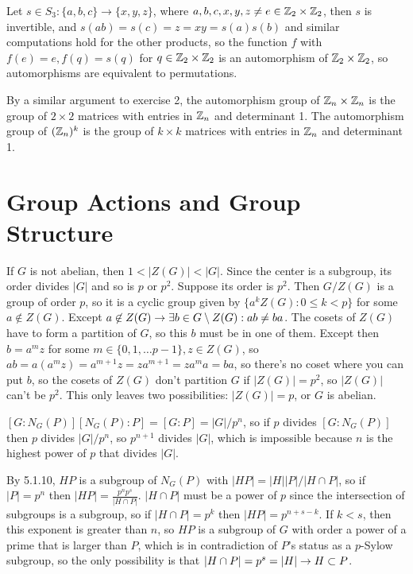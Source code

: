 \documentclass[11pt, oneside]{article}   	%
\begin{document}
\item Let $s \in S_3: \{a, b, c\} \to \{x, y, z\}$, where $a, b, c, x, y, z \not= e \in \mathbb{Z}_2 \times \mathbb{Z}_2$, then $s$ is invertible, and $s(ab) = s(c) = z = xy = s(a)s(b)$ and similar computations hold for the other products, so the function $f$ with $f(e) = e, f(q) = s(q)$ for $q \in \mathbb{Z}_2 \times \mathbb{Z}_2$ is an automorphism of $\mathbb{Z}_2 \times \mathbb{Z}_2$, so automorphisms are equivalent to permutations.
\ee
\item By a similar argument to exercise 2, the automorphism group of $\mathbb{Z}_n \times \mathbb{Z}_n$ is the group of $2 \times 2$ matrices with entries in $\mathbb{Z}_n$ and determinant 1. The automorphism group of $(\mathbb{Z}_n)^k$ is the group of $k \times k$ matrices with entries in $\mathbb{Z}_n$ and determinant 1.
\ee
\section{Group Actions and Group Structure}
\be
\item If $G$ is not abelian, then $1 < |Z(G)| < |G|$. Since the center is a subgroup, its order divides $|G|$ and so is $p$ or $p^2$. Suppose its order is $p^2$. Then $G/Z(G)$ is a group of order $p$, so it is a cyclic group given by $\{a^kZ(G): 0 \le k < p\}$ for some $a \not \in Z(G)$. Except $a \not \in Z(G) \rightarrow \exists b \in G \setminus Z(G): ab \not = ba$. The cosets of $Z(G)$ have to form a partition of $G$, so this $b$ must be in one of them. Except then $b = a^mz$ for some $m \in \{0, 1, \ldots p-1\}, z \in Z(G)$, so $ab = a(a^mz) = a^{m+1}z = za^{m+1} = za^ma = ba$, so there's no coset where you can put $b$, so the cosets of $Z(G)$ don't partition $G$ if $|Z(G)| = p^2$, so $|Z(G)|$ can't be $p^2$. This only leaves two possibilities: $|Z(G)| = p$, or $G$ is abelian.
\item $[G:N_G(P)][N_G(P):P] = [G:P] = |G| / p^n$, so if $p$ divides $[G:N_G(P)]$ then $p$ divides $|G|/p^n$, so $p^{n+1}$ divides $|G|$, which is impossible because $n$ is the highest power of $p$ that divides $|G|$.
\item By 5.1.10, $HP$ is a subgroup of $N_G(P)$ with $|HP| = |H||P| / |H \cap P|$, so if $|P| = p^n$ then $|HP| = \frac{p^np^s}{|H\cap P|}$. $|H\cap P|$ must be a power of $p$ since the intersection of subgroups is a subgroup, so if $|H\cap P| = p^k$ then $|HP| = p^{n + s - k}$. If $k<s$, then this exponent is greater than $n$, so $HP$ is a subgroup of $G$ with order a power of a prime that is larger than $P$, which is in contradiction of $P$'s status as a $p$-Sylow subgroup, so the only possibility is that $|H \cap P| = p^s = |H| \rightarrow H \subset P$.
\end{document}
